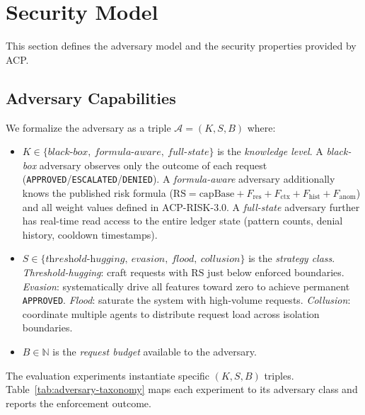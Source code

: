 \documentclass[11pt]{article}
\theoremstyle{definition}
\begin{document}
\section{Security Model}
\label{sec:security-model}

This section defines the adversary model and the security properties provided by ACP.

\subsection{Adversary Capabilities}
\label{sec:adversary-model}

We formalize the adversary as a triple $\mathcal{A} = (K, S, B)$ where:

\begin{itemize}[noitemsep]
  \item $K \in \{\textit{black-box},\ \textit{formula-aware},\ \textit{full-state}\}$ is the \emph{knowledge level}.
    A \emph{black-box} adversary observes only the outcome of each request
    (\texttt{APPROVED}/\texttt{ESCALATED}/\texttt{DENIED}).
    A \emph{formula-aware} adversary additionally knows the published risk formula
    ($\mathrm{RS} = \mathrm{capBase} + F_{\mathrm{res}} + F_{\mathrm{ctx}} + F_{\mathrm{hist}} + F_{\mathrm{anom}}$)
    and all weight values defined in ACP-RISK-3.0.
    A \emph{full-state} adversary further has real-time read access to the entire ledger
    state (pattern counts, denial history, cooldown timestamps).

  \item $S \in \{\textit{threshold-hugging},\ \textit{evasion},\ \textit{flood},\ \textit{collusion}\}$ is the \emph{strategy class}.
    \emph{Threshold-hugging}: craft requests with $\mathrm{RS}$ just below enforced boundaries.
    \emph{Evasion}: systematically drive all features toward zero to achieve permanent \texttt{APPROVED}.
    \emph{Flood}: saturate the system with high-volume requests.
    \emph{Collusion}: coordinate multiple agents to distribute request load across isolation boundaries.

  \item $B \in \mathbb{N}$ is the \emph{request budget} available to the adversary.
\end{itemize}

The evaluation experiments instantiate specific $(K, S, B)$ triples.
Table~\ref{tab:adversary-taxonomy} maps each experiment to its adversary class and
reports the enforcement outcome.
\end{document}
